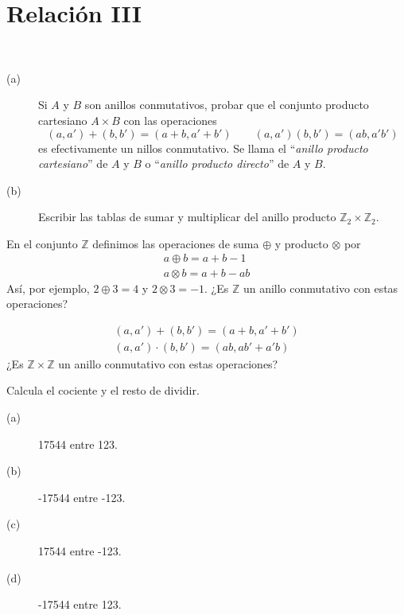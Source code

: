 \section{Relación III}

\begin{ejercicio}
    \ 
    \begin{description}
        \item [(a)] 
            Si $A$ y $B$ son anillos conmutativos, probar que el conjunto producto cartesiano $A\times B$ con las operaciones
            \begin{equation*}
                (a,a')+(b,b')=(a+b,a'+b')\qquad (a,a')(b,b')=(ab,a'b')
            \end{equation*}
            es efectivamente un nillos conmutativo. Se llama el ``\emph{anillo producto cartesiano}'' de $A$ y $B$ o ``\emph{anillo producto directo}'' de $A$ y $B$.
        \item [(b)] Escribir las tablas de sumar y multiplicar del anillo producto $\mathbb{Z}_2\times \mathbb{Z}_2$.
    \end{description}
\end{ejercicio}

\begin{ejercicio}
    En el conjunto $\mathbb{Z}$ definimos las operaciones de suma $\oplus$ y producto $\otimes$ por
    \begin{gather*}
        a \oplus b = a + b - 1 \\
        a \otimes b = a + b - ab
    \end{gather*}
    Así, por ejemplo, $2\oplus 3 = 4$ y $2\otimes 3 = -1$. ¿Es $\mathbb{Z}$ un anillo conmutativo con estas operaciones?
\end{ejercicio}

\begin{ejercicio}
    \begin{gather*}
        (a,a') + (b,b') = (a+b, a'+b') \\
        (a,a')\cdot (b,b') = (ab, ab'+a'b)
    \end{gather*}
    ¿Es $\mathbb{Z}\times \mathbb{Z}$ un anillo conmutativo con estas operaciones?
\end{ejercicio}

\begin{ejercicio}
    Calcula el cociente y el resto de dividir.
    \begin{description}
        \item [(a)] 17544 entre 123.
        \item [(b)] -17544 entre -123.
        \item [(c)] 17544 entre -123.
        \item [(d)] -17544 entre 123.
    \end{description}
\end{ejercicio}

